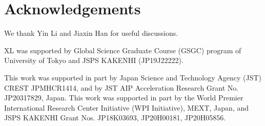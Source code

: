 \documentclass[twocolumn]{aastex63}
\begin{document}
\section*{Acknowledgements}
We thank Yin Li and Jiaxin Han for useful discussions.

XL was supported by Global Science Graduate Course (GSGC) program of University
of Tokyo and JSPS KAKENHI (JP19J22222).

This work was supported in part by Japan Science and Technology Agency (JST)
CREST JPMHCR1414, and by JST AIP Acceleration Research Grant No. JP20317829,
Japan. This work was supported in part by the World Premier International
Research Center Initiative (WPI Initiative), MEXT, Japan, and JSPS KAKENHI
Grant Nos. JP18K03693, JP20H00181, JP20H05856.



\end{document}
